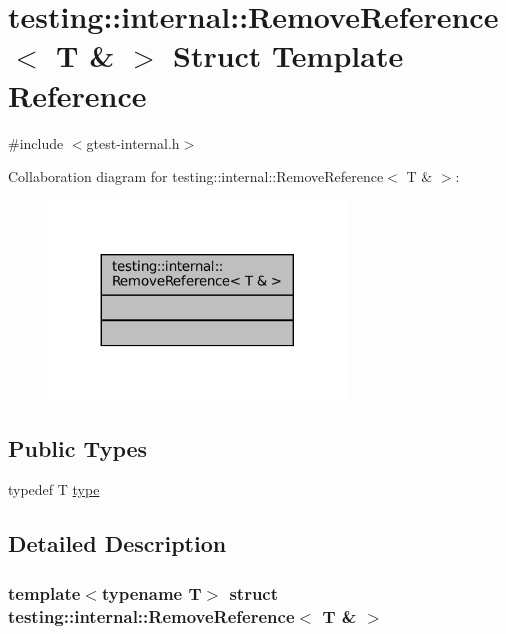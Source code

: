 \hypertarget{structtesting_1_1internal_1_1RemoveReference_3_01T_01_6_01_4}{}\section{testing\+:\+:internal\+:\+:Remove\+Reference$<$ T \& $>$ Struct Template Reference}
\label{structtesting_1_1internal_1_1RemoveReference_3_01T_01_6_01_4}


{\ttfamily \#include $<$gtest-\/internal.\+h$>$}



Collaboration diagram for testing\+:\+:internal\+:\+:Remove\+Reference$<$ T \& $>$\+:
\nopagebreak
\begin{figure}[H]
\begin{center}
\leavevmode
\includegraphics[width=224pt]{structtesting_1_1internal_1_1RemoveReference_3_01T_01_6_01_4__coll__graph}
\end{center}
\end{figure}
\subsection*{Public Types}
\begin{DoxyCompactItemize}
\item 
typedef T \hyperlink{structtesting_1_1internal_1_1RemoveReference_3_01T_01_6_01_4_a3d0f32a66759f333c2dd66aa31005e6d}{type}
\end{DoxyCompactItemize}


\subsection{Detailed Description}
\subsubsection*{template$<$typename T$>$\newline
struct testing\+::internal\+::\+Remove\+Reference$<$ T \& $>$}



